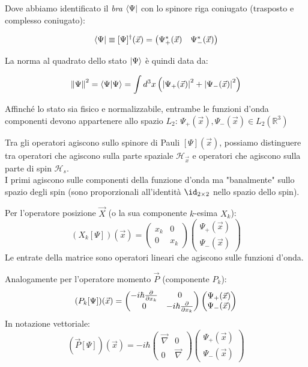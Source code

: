 Dove abbiamo identificato il \textit{bra} \( \bra{\Psi} \) con lo spinore riga coniugato (trasposto e complesso coniugato):

\[
\bra{\Psi} \equiv [\Psi]^\dagger(\vec{x}) = \begin{pmatrix} \Psi_+^*(\vec{x}) & \Psi_-^*(\vec{x}) \end{pmatrix}
\]


La norma al quadrato dello stato \( \ket{\Psi} \) è quindi data da:

\[
\norm{\Psi}^2 = \braket{\Psi}{\Psi} = \int d^3x \left( \abs{\Psi_+(\vec{x})}^2 + \abs{\Psi_-(\vec{x})}^2 \right)
\]

Affinché lo stato sia fisico e normalizzabile, entrambe le funzioni d'onda componenti devono appartenere allo spazio \( L_2 \):
\(
\Psi_+(\vec{x}), \Psi_-(\vec{x}) \in L_2(\mathbb{R}^3)
\)

Tra gli operatori agiscono sullo spinore di Pauli $[\Psi](\vec{x})$, possiamo distinguere tra operatori che agiscono sulla parte spaziale \( \mathcal{H}_{\vec{x}} \) e operatori che agiscono sulla parte di spin \( \mathcal{H}_s \).\\
I primi agiscono sulle componenti della funzione d'onda ma "banalmente" sullo spazio degli spin (sono proporzionali all'identità \( \id_{2\times 2} \) nello spazio dello spin).

Per l'operatore posizione \( \vec{X} \) (o la sua componente \( k \)-esima \( X_k \)):
\[
(X_k [\Psi])(\vec{x}) = \begin{pmatrix} x_k & 0 \\ 0 & x_k \end{pmatrix} \begin{pmatrix} \Psi_+(\vec{x}) \\ \Psi_-(\vec{x}) \end{pmatrix} 
\]
Le entrate della matrice sono operatori lineari che agiscono sulle funzioni d'onda.

Analogamente per l'operatore momento \( \vec{P} \) (componente \( P_k \)):
\[
(P_k [\Psi])(\vec{x}) = \begin{pmatrix} -i\hbar \pdv{x_k} & 0 \\ 0 & -i\hbar \pdv{x_k} \end{pmatrix} \begin{pmatrix} \Psi_+(\vec{x}) \\ \Psi_-(\vec{x}) \end{pmatrix} 
\]
In notazione vettoriale:
\[
(\vec{P} [\Psi])(\vec{x}) = -i\hbar \begin{pmatrix} \vec{\nabla} & 0 \\ 0 & \vec{\nabla} \end{pmatrix} \begin{pmatrix} \Psi_+(\vec{x}) \\ \Psi_-(\vec{x}) \end{pmatrix}
\]


